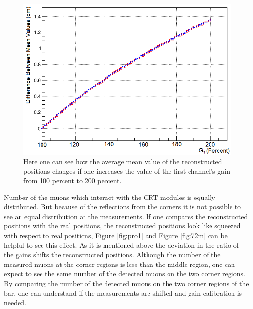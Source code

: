 \documentclass[a4paper]{article}\linespread{1.4}
\begin{document}
\begin{figure}[] \hspace*{-1cm} \includegraphics[width=130mm,scale=1.0]{figures/gdp.png} \caption{Here one can see how the average mean value of the reconstructed positions changes if one increases the value of the first channel's gain from 100 percent to 200 percent.} \label{fig:gdp} \end{figure}  

Number of the muons which interact with the CRT modules is equally distributed. %
But because of the reflections from the corners it is not possible to see an equal distribution at the measurements. 
If one compares the reconstructed positions with the real positions, the reconstructed positions look like squeezed with respect to real positions, Figure \ref{fig:pro1} and Figure \ref{fig:72m} can be helpful to see this effect. 
As it is mentioned above the deviation in the ratio of the gains shifts the reconstructed positions. 
Although the number of the measured muons at the corner regions is less than the middle region, one can expect to see the same number of the detected muons on the two corner regions. 
By comparing the number of the detected muons on the two corner regions of the bar, one can understand if the measurements are shifted and gain calibration is needed. 

\end{document}
